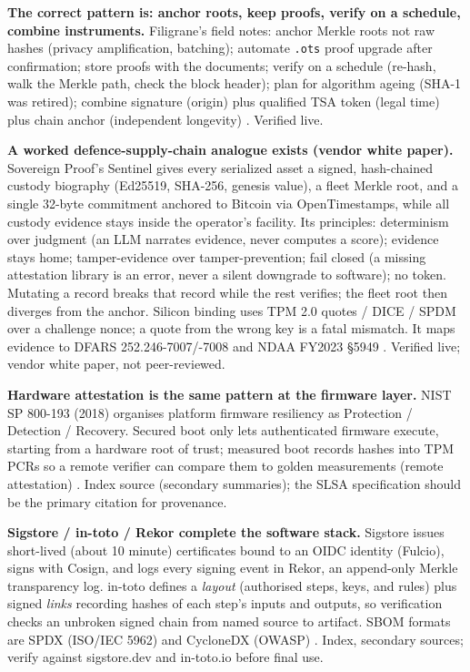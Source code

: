 \documentclass[11pt]{article}
\begin{document}
\textbf{The correct pattern is: anchor roots, keep proofs, verify on a
schedule, combine instruments.} Filigrane's field notes: anchor Merkle
roots not raw hashes (privacy amplification, batching); automate
\texttt{.ots} proof upgrade after confirmation; store proofs with the
documents; verify on a schedule (re-hash, walk the Merkle path, check
the block header); plan for algorithm ageing (SHA-1 was retired);
combine signature (origin) plus qualified TSA token (legal time) plus
chain anchor (independent longevity) \cite{filigrane2026}. Verified live.

\textbf{A worked defence-supply-chain analogue exists (vendor white
paper).} Sovereign Proof's Sentinel gives every serialized asset a
signed, hash-chained custody biography (Ed25519, SHA-256, genesis
value), a fleet Merkle root, and a single 32-byte commitment anchored to
Bitcoin via OpenTimestamps, while all custody evidence stays inside the
operator's facility. Its principles: determinism over judgment (an LLM
narrates evidence, never computes a score); evidence stays home;
tamper-evidence over tamper-prevention; fail closed (a missing
attestation library is an error, never a silent downgrade to software);
no token. Mutating a record breaks that record while the rest verifies;
the fleet root then diverges from the anchor. Silicon binding uses TPM
2.0 quotes / DICE / SPDM over a challenge nonce; a quote from the wrong
key is a fatal mismatch. It maps evidence to DFARS 252.246-7007/-7008
and NDAA FY2023 \S5949 \cite{sovereign2026}. Verified live; vendor white
paper, not peer-reviewed.

\textbf{Hardware attestation is the same pattern at the firmware
layer.} NIST SP 800-193 (2018) organises platform firmware resiliency
as Protection / Detection / Recovery. Secured boot only lets
authenticated firmware execute, starting from a hardware root of trust;
measured boot records hashes into TPM PCRs so a remote verifier can
compare them to golden measurements (remote attestation)
\cite{nist800193}. Index source (secondary summaries); the SLSA
specification should be the primary citation for provenance.

\textbf{Sigstore / in-toto / Rekor complete the software stack.}
Sigstore issues short-lived (about 10 minute) certificates bound to an
OIDC identity (Fulcio), signs with Cosign, and logs every signing event
in Rekor, an append-only Merkle transparency log. in-toto defines a
\emph{layout} (authorised steps, keys, and rules) plus signed
\emph{links} recording hashes of each step's inputs and outputs, so
verification checks an unbroken signed chain from named source to
artifact. SBOM formats are SPDX (ISO/IEC 5962) and CycloneDX (OWASP)
\cite{sigstore-guide}. Index, secondary sources; verify against
sigstore.dev and in-toto.io before final use.
\end{document}
